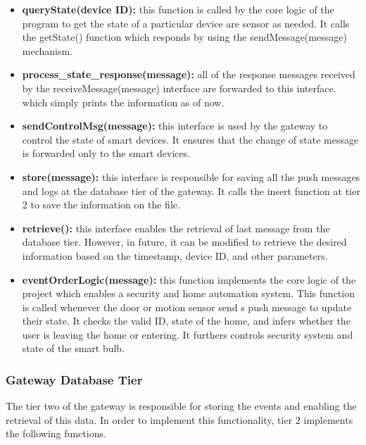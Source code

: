 \documentclass[12pt]{article}
\begin{document}
\begin{itemize}
	\item \textbf{queryState(device ID):} this function is called by the core logic 
	of the program to get the state of a particular device are sensor as needed. 
	It calls the getState() function which responds by using the sendMessage(message) 
	mechanism. 
	
	\item \textbf{process\_state\_response(message):} all of the response messages received 
	by the receiveMessage(message) interface are forwarded to this interface. which simply 
	prints the information as of now. 
	
	\item \textbf{sendControlMsg(message):} this interface is used by the gateway to 
	control the state of smart devices. It ensures that the change of state message is 
	forwarded only to the smart devices. 
	
	\item \textbf{store(message):} this interface is responsible for saving 
	all the push messages and logs at the database tier of the gateway. It calls the insert 
	function at tier 2 to save the information on the file. 
	
	\item \textbf{retrieve():} this interface enables the retrieval of last message from the 
	database tier. However, in future, it can be modified to retrieve the desired information based
	 on the timestamp, device  ID, and other parameters.
	 
	 \item \textbf{eventOrderLogic(message):} this function implements the core logic of the 
	 project which enables a security and home automation system. This function is called whenever the door or motion sensor send s push message to update their state. It 
	 checks the valid ID, state of the home, and infers whether the user is leaving the home 
	 or entering. It furthers controls security system and state of the smart bulb. 
\end{itemize}

\subsubsection{Gateway Database Tier}

The tier two of the gateway is responsible for storing the events and enabling 
the retrieval of this data. In order to implement this functionality, tier 2 implements the 
following functions. 
\end{document}
